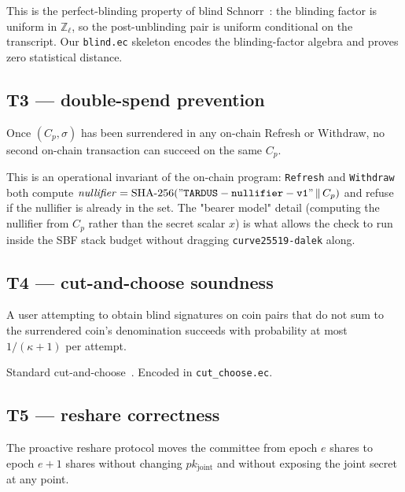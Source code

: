 This is the perfect-blinding property of blind Schnorr~\cite{chaum1982}: the blinding factor is uniform in $\mathbb{Z}_\ell$, so the post-unblinding pair is uniform conditional on the transcript. Our \texttt{blind.ec} skeleton encodes the blinding-factor algebra and proves zero statistical distance.

\subsection{T3 --- double-spend prevention}

\begin{theorem}
\label{thm:T3}
Once $(C_p, \sigma)$ has been surrendered in any on-chain Refresh or Withdraw, no second on-chain transaction can succeed on the same $C_p$.
\end{theorem}

This is an operational invariant of the on-chain program: \texttt{Refresh} and \texttt{Withdraw} both compute $\mathit{nullifier} = \operatorname{SHA-256}(\mathtt{"TARDUS-nullifier-v1"} \,\|\, C_p)$ and refuse if the nullifier is already in the set. The "bearer model" detail (computing the nullifier from $C_p$ rather than the secret scalar $x$) is what allows the check to run inside the SBF stack budget without dragging \texttt{curve25519-dalek} along.

\subsection{T4 --- cut-and-choose soundness}

\begin{theorem}
\label{thm:T4}
A user attempting to obtain blind signatures on coin pairs that do not sum to the surrendered coin's denomination succeeds with probability at most $1/(\kappa + 1)$ per attempt.
\end{theorem}

Standard cut-and-choose~\cite{dold2019}. Encoded in \texttt{cut\_choose.ec}.

\subsection{T5 --- reshare correctness}

\begin{theorem}
\label{thm:T5}
The proactive reshare protocol moves the committee from epoch $e$ shares to epoch $e + 1$ shares without changing $pk_{\mathrm{joint}}$ and without exposing the joint secret at any point.
\end{theorem}

